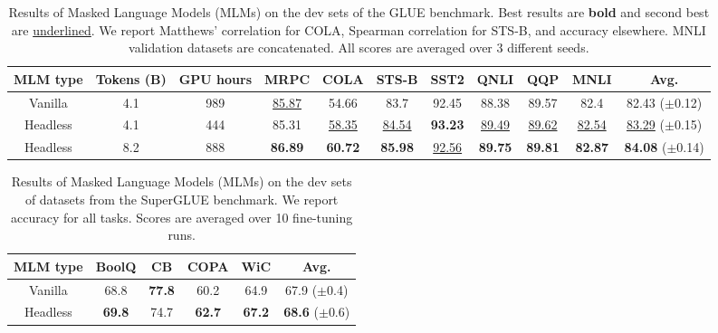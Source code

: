 \begin{table}
\small \centering
\begin{tabular}{@{}ccc|cccccccc@{}}
\toprule
MLM type        & Tokens (B) & GPU hours & MRPC                        & COLA                        & STS-B                      & SST2                        & QNLI                        & QQP                         & MNLI                        & \textbf{Avg.} \\ \midrule
Vanilla  &4.1& 989& \underline{85.87}          & 54.66          & 83.7         & 92.45        & 88.38      & 89.57         & 82.4       & 82.43 \tiny{($\pm$0.12)}         \\ 
Headless &4.1& 444& 85.31                       & \underline{58.35}                       & \underline{84.54}                      & \textbf{93.23}                       & \underline{89.49}                       & \underline{89.62}                       & \underline{82.54}                       & \underline{83.29} \tiny{($\pm$0.15)}            \\ 
Headless &8.2&888& \textbf{86.89} & \textbf{60.72} & \textbf{85.98 } & \underline{92.56} & \textbf{89.75} & \textbf{89.81} & \textbf{82.87 } & \textbf{84.08} \tiny{($\pm$0.14)} \\ \bottomrule
\end{tabular}
\caption{Results of Masked Language Models (MLMs) on the dev sets of the GLUE benchmark. Best results are \textbf{bold} and second best are \underline{underlined}. We report Matthews' correlation for COLA, Spearman correlation for STS-B, and accuracy elsewhere. MNLI validation datasets are concatenated. All scores are averaged over 3 different seeds.}
\label{tab:glue_res}
\end{table}

\begin{table}
\centering
\small
\begin{tabular}{@{}c|ccccc@{}}
\toprule
MLM type & BoolQ          & CB             & COPA           & WiC            & Avg.           \\ \midrule
Vanilla  & 68.8          & \textbf{77.8} & 60.2          & 64.9          & 67.9 \tiny{($\pm$0.4)}          \\ 
Headless & \textbf{69.8} & 74.7          & \textbf{62.7} & \textbf{67.2} & \textbf{68.6} \tiny{($\pm$0.6)} \\ \bottomrule
\end{tabular}
\caption{Results of Masked Language Models (MLMs) on the dev sets of datasets from the SuperGLUE benchmark. We report accuracy for all tasks. Scores are averaged over 10 fine-tuning runs.}
\end{table}

